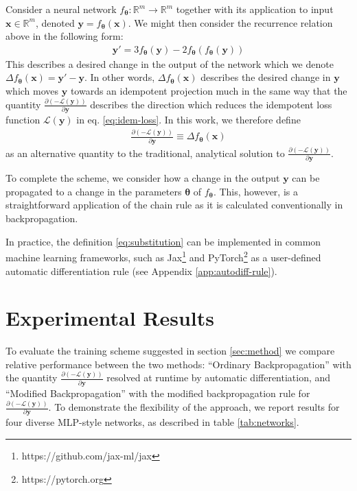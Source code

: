 \documentclass{article}
\theoremstyle{plain}
\theoremstyle{definition}
\theoremstyle{remark}
\newcommand{\vx}{\mathbf{x}}
\newcommand{\vy}{\mathbf{y}}
\newcommand{\vtheta}{\bm{\theta}}
\newcommand{\pd}[2]{\frac{\partial{#1}}{\partial{#2}}}
\begin{document}
Consider a neural network $f_{\vtheta}: \mathbb{R}^m \to \mathbb{R}^m$ together with its application to input $\vx \in \mathbb{R}^m$, denoted $\vy = f_{\vtheta}(\vx)$. We might then consider the recurrence relation above in the following form:
%
\begin{align*}
    \vy' = 3f_{\vtheta}(\vy) - 2f_{\vtheta}(f_{\vtheta}(\vy))
\end{align*}
%
This describes a desired change in the output of the network which we denote ${\Delta f_{\vtheta}(\vx) = \vy' - \vy}$. In other words, $\Delta f_{\vtheta}(\vx)$ describes the desired change in $\vy$ which moves $\vy$ towards an idempotent projection much in the same way that the quantity $\pd{(-\mathcal{L}(\vy))}{\vy}$ describes the direction which reduces the idempotent loss function $\mathcal{L}(\vy)$ in eq. \ref{eq:idem-loss}. In this work, we therefore define
%
\begin{align}
    \pd{(-\mathcal{L}(\vy))}{\vy} \equiv \Delta f_{\vtheta}(\vx)
    \label{eq:substitution}
\end{align}
%
as an alternative quantity to the traditional, analytical solution to $\pd{(-\mathcal{L}(\vy))}{\vy}$.

To complete the scheme, we consider how a change in the output $\vy$ can be propagated to a change in the parameters $\vtheta$ of $f_{\vtheta}$. This, however, is a straightforward application of the chain rule as it is calculated conventionally in backpropagation.

In practice, the definition \ref{eq:substitution} can be implemented in common machine learning frameworks, such as Jax\footnote{https://github.com/jax-ml/jax} and PyTorch\footnote{https://pytorch.org} as a user-defined automatic differentiation rule (see Appendix \ref{app:autodiff-rule}).

\section{Experimental Results}
\label{sec:experiment}
To evaluate the training scheme suggested in section \ref{sec:method} we compare relative performance between the two methods: ``Ordinary Backpropagation'' with the quantity $\pd{(-\mathcal{L}(\vy))}{\vy}$ resolved at runtime by automatic differentiation, and ``Modified Backpropagation'' with the modified backpropagation rule for $\pd{(-\mathcal{L}(\vy))}{\vy}$. To demonstrate the flexibility of the approach, we report results for four diverse MLP-style networks, as described in table \ref{tab:networks}.
\end{document}
